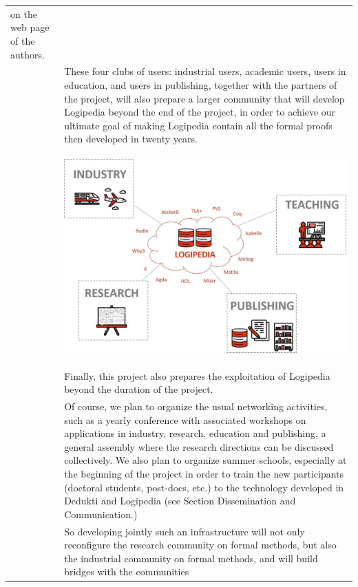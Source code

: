 \begin{longtable}{|p{}|p{}|}
on the web page of the authors.\\
&
\hspace{0.4cm}
These four clubs of users: industrial users, academic users, users in 
education, and users in publishing, together with the partners of the 
project, will also
prepare a larger community that will develop Logipedia beyond the end
of the project, in order to achieve our ultimate goal of making
Logipedia contain all the formal proofs then developed in twenty
years.\\
&
\begin{center}
\includegraphics[width=12cm]{img/Schema-reduced}
\end{center}\\
&
\hspace{0.4cm}
Finally, this project also prepares the exploitation of Logipedia
beyond the duration of the project.\\
&
\hspace{0.4cm}
Of course, we plan to organize the usual networking activities,
such as a yearly conference with associated workshops on applications
in industry, research, education and publishing, a general assembly
where the research directions can be discussed collectively. We also plan to organize
summer schools, especially at the beginning of the project in order to
train the new participants (doctoral students, post-docs, etc.) to the
technology developed in Dedukti and Logipedia
(see Section Dissemination and Communication.)\\
&
\hspace{0.4cm}
So developing jointly such an infrastructure will not only reconfigure
the research community on formal methods, but also the industrial
community on formal methods, and will build bridges with the communities

\end{longtable}
